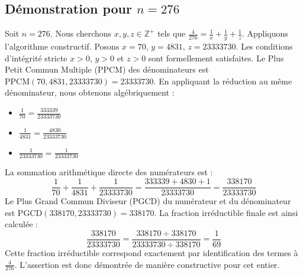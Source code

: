 \documentclass[11pt,a4paper]{article}
\begin{document}
\subsection{Démonstration pour $n = 276$}
Soit $n = 276$. Nous cherchons $x, y, z \in \mathbb{Z}^{+}$ tels que $\frac{4}{276} = \frac{1}{x} + \frac{1}{y} + \frac{1}{z}$.
Appliquons l'algorithme constructif. Posons $x = 70$, $y = 4831$, $z = 23333730$.
Les conditions d'intégrité stricte $x > 0$, $y > 0$ et $z > 0$ sont formellement satisfaites.
Le Plus Petit Commun Multiple (PPCM) des dénominateurs est $\text{PPCM}(70, 4831, 23333730) = 23333730$.
En appliquant la réduction au même dénominateur, nous obtenons algébriquement :
\begin{itemize}
    \item $\frac{1}{70} = \frac{333339}{23333730}$
    \item $\frac{1}{4831} = \frac{4830}{23333730}$
    \item $\frac{1}{23333730} = \frac{1}{23333730}$
\end{itemize}
La sommation arithmétique directe des numérateurs est :
$$ \frac{1}{70} + \frac{1}{4831} + \frac{1}{23333730} = \frac{333339 + 4830 + 1}{23333730} = \frac{338170}{23333730} $$
Le Plus Grand Commun Diviseur (PGCD) du numérateur et du dénominateur est $\text{PGCD}(338170, 23333730) = 338170$.
La fraction irréductible finale est ainsi calculée :
$$ \frac{338170}{23333730} = \frac{338170 \div 338170}{23333730 \div 338170} = \frac{1}{69} $$
Cette fraction irréductible correspond exactement par identification des termes à $\frac{4}{276}$. L'assertion est donc démontrée de manière constructive pour cet entier.
\end{document}
